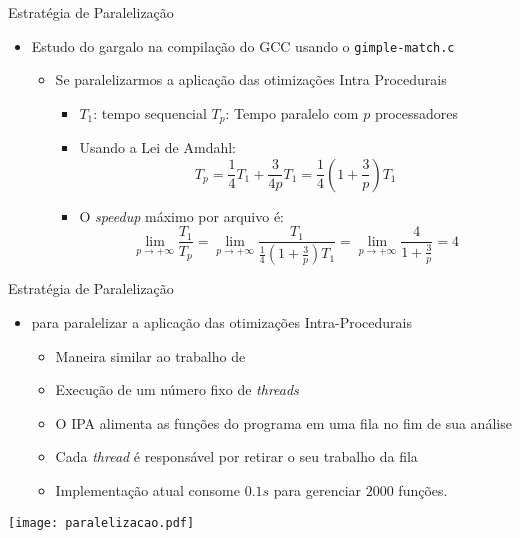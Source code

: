 \begin{frame}{Estratégia de Paralelização}
    \begin{itemize}
        \item Estudo do gargalo na compilação do GCC usando o \texttt{gimple-match.c}
            \begin{itemize}
                \item Se paralelizarmos a aplicação das otimizações Intra Procedurais
            \begin{itemize}
                \item $T_1$: tempo sequencial \hfil\hfil $T_p$: Tempo paralelo com $p$ processadores
                \item Usando a Lei de Amdahl:
$$ T_p = \frac{1}{4} T_1 + \frac{3}{4p}T_1 = \frac{1}{4} \left( 1 + \frac{3}{p}
\right)T_1 $$ 
                \item O \textit{speedup} máximo por arquivo é: $$
\lim_{p \rightarrow +\infty} \frac{T_1}{T_p} = \lim_{p \rightarrow +\infty}
\frac{T_1}{\frac{1}{4} \left( 1 + \frac{3}{p} \right)T_1} = \lim_{p \rightarrow
+\infty} \frac{4}{1 + \frac{3}{p}} = 4$$
            \end{itemize}
            \end{itemize}
    \end{itemize}
\end{frame}


\begin{frame}{Estratégia de Paralelização}
    \begin{itemize}
        \item {\color{blue}{Estratégia corrente}} para paralelizar a aplicação das otimizações Intra-Procedurais
            \begin{itemize}
                \item Maneira similar ao trabalho de \cite{wortman1992}
                \item Execução de um número fixo de \textit{threads}
                \item O IPA alimenta as funções do programa em uma fila no fim de sua análise
                \item Cada \textit{thread} é responsável por retirar o seu trabalho da fila
                \item Implementação atual consome $0.1s$ para gerenciar $2000$ funções.
    \end{itemize}
\end{itemize}

 \centering
 \texttt{[image: paralelizacao.pdf]}
\end{frame}

